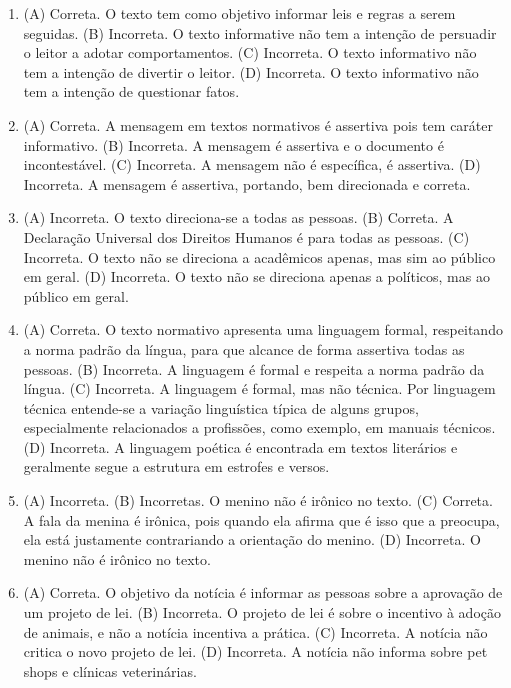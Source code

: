 \begin{enumerate}
\item (A) Correta. O texto tem como objetivo informar leis e regras a serem
seguidas.
(B) Incorreta. O texto informative não tem a intenção de persuadir o leitor a adotar comportamentos.
(C) Incorreta. O texto informativo não tem a intenção de divertir o leitor.
(D) Incorreta. O texto informativo não tem a intenção de questionar fatos.

\item (A) Correta. A mensagem em textos normativos é assertiva pois tem caráter
informativo.
(B) Incorreta. A mensagem é assertiva e o documento é incontestável.
(C) Incorreta. A mensagem não é específica, é assertiva.
(D) Incorreta. A mensagem é assertiva, portando, bem direcionada e
correta.

\item (A) Incorreta. O texto direciona-se a todas as pessoas.
(B) Correta. A Declaração Universal dos Direitos Humanos é para todas as
pessoas.
(C) Incorreta. O texto não se direciona a acadêmicos apenas, mas sim ao
  público em geral.
(D)  Incorreta. O texto não se direciona apenas a políticos, mas ao público
  em geral.

\item (A) Correta. O texto normativo apresenta uma linguagem formal,
respeitando a norma padrão da língua, para que alcance de forma
assertiva todas as pessoas.
(B) Incorreta. A linguagem é formal e respeita a norma padrão da língua.
(C) Incorreta. A linguagem é formal, mas não técnica. Por linguagem
técnica entende-se a variação linguística típica de alguns grupos,
especialmente relacionados a profissões, como exemplo, em manuais
técnicos.
(D) Incorreta. A linguagem poética é encontrada em textos literários e
geralmente segue a estrutura em estrofes e versos.

\item (A) Incorreta. 
(B) Incorretas. O menino não é irônico no texto.
(C) Correta. A fala da menina é irônica, pois quando ela afirma que é
isso que a preocupa, ela está justamente contrariando a orientação do
menino.
(D) Incorreta. O menino não é irônico no texto.

\item (A)
  Correta. O objetivo da notícia é informar as pessoas sobre a aprovação
  de um projeto de lei.
(B)
  Incorreta. O projeto de lei é sobre o incentivo à adoção de animais, e
  não a notícia incentiva a prática.
(C)
  Incorreta. A notícia não critica o novo projeto de lei.
(D)
  Incorreta. A notícia não informa sobre pet shops e clínicas
  veterinárias.


\end{enumerate}
